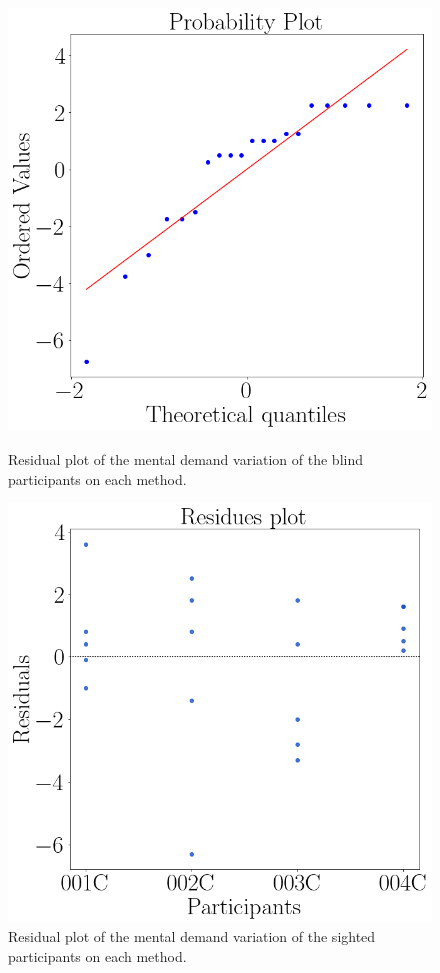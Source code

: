 \begin{figure}[!htb]
    \centering
    \begin{minipage}{0.45\textwidth}
        \centering
        \includegraphics[width = 0.8\linewidth]{Resultados/Nasa/Figuras/png/qqplot_md_var_blind.png}
        \caption{Residual plot of the mental demand variation of the blind participants on each method.}
        \label{fig:qqplot_md_var_blind}
    \end{minipage}
    \begin{minipage}{0.45\textwidth}
        \centering
        \includegraphics[width = 0.8\linewidth]{Resultados/Nasa/Figuras/png/residplot_md_var_blind.png}
        \caption{Residual plot of the mental demand variation of the sighted participants on each method.}
        \label{fig:residplot_md_var_blind}
    \end{minipage}
\end{figure}

